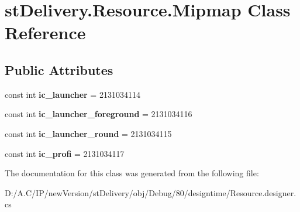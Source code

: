 \hypertarget{classst_delivery_1_1_resource_1_1_mipmap}{}\section{st\+Delivery.\+Resource.\+Mipmap Class Reference}
\label{classst_delivery_1_1_resource_1_1_mipmap}
\subsection*{Public Attributes}
\begin{DoxyCompactItemize}
\item 
\mbox{\label{classst_delivery_1_1_resource_1_1_mipmap_a469e62d52ef6e67d268e8043c6d3b76d}} 
const int {\bfseries ic\+\_\+launcher} = 2131034114
\item 
\mbox{\label{classst_delivery_1_1_resource_1_1_mipmap_a2aa94b0c437ade62b712222d045dbc14}} 
const int {\bfseries ic\+\_\+launcher\+\_\+foreground} = 2131034116
\item 
\mbox{\label{classst_delivery_1_1_resource_1_1_mipmap_a97b67c8f76f2c9d746a6dcc6f79a7cd5}} 
const int {\bfseries ic\+\_\+launcher\+\_\+round} = 2131034115
\item 
\mbox{\label{classst_delivery_1_1_resource_1_1_mipmap_a01825b217b042cf4f60d41e5621e52ee}} 
const int {\bfseries ic\+\_\+profi} = 2131034117
\end{DoxyCompactItemize}


The documentation for this class was generated from the following file\+:\begin{DoxyCompactItemize}
\item 
D\+:/\+A.\+C/\+I\+P/new\+Version/st\+Delivery/obj/\+Debug/80/designtime/Resource.\+designer.\+cs\end{DoxyCompactItemize}
